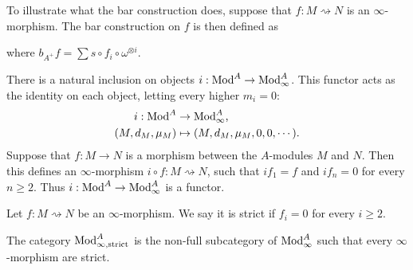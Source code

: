 \documentclass[../thesis.tex]{subfiles}
\begin{document}
            To illustrate what the bar construction does, suppose that $f: M \rightsquigarrow N$ is an $\infty$-morphism. The bar construction on $f$ is then defined as
            \begin{center}
            \end{center}
            where $b_{A^+}f = \sum s \circ f_i \circ \omega^{\otimes i}$.

            There is a natural inclusion on objects $i: \tt{Mod}^A \rightarrow \tt{Mod}_\infty^A$. This functor acts as the identity on each object, letting every higher $m_i = 0$:
            \begin{align*}
                i : \tt{Mod}^A & \rightarrow \tt{Mod}_\infty^A\tt{,}\\
                (M, d_M, \mu_M) & \mapsto (M, d_M, \mu_M, 0, 0, \cdots)\tt{.}
            \end{align*}
            Suppose that $f: M \rightarrow N$ is a morphism between the $A$-modules $M$ and $N$. Then this defines an $\infty$-morphism $i\circ f : M \rightsquigarrow N$, such that $if_1 = f$ and $if_n = 0$ for every $n \geq 2$. Thus $i : \tt{Mod}^A \rightarrow \tt{Mod}_\infty^A$ is a functor.
            
            \begin{definition}
                Let $f : M \rightsquigarrow N$ be an $\infty$-morphism. We say it is strict if $f_i = 0$ for every $i \geq 2$.
            \end{definition}

            The category $\tt{Mod}_{\infty, \tt{strict}}^A$ is the non-full subcategory of $\tt{Mod}_{\infty}^A$ such that every $\infty$-morphism are strict. 
            
\end{document}
